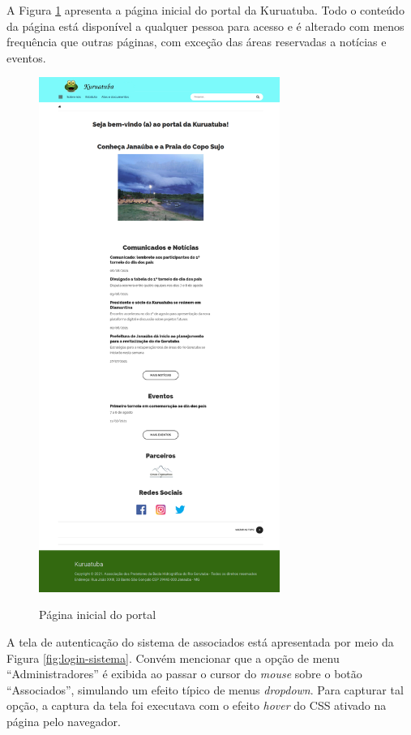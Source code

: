 A Figura \ref{fig:home-portal} apresenta a página inicial do portal da Kuruatuba. Todo o conteúdo da página está disponível a qualquer pessoa para acesso e é alterado com menos frequência que outras páginas, com exceção das áreas reservadas a notícias e eventos.

\clearpage
\newpage

\begin{figure}[htb]
 \centering
 \caption{Página inicial do portal}
 \includegraphics[width=0.7\textwidth]{figuras/kuruatuba_portal_home.png}
 \label{fig:home-portal}
\end{figure}

\newpage
\clearpage

A tela de autenticação do sistema de associados está apresentada por meio da Figura \ref{fig:login-sistema}. Convém mencionar que a opção de menu ``Administradores'' é exibida ao passar o cursor do \textit{mouse} sobre o botão ``Associados'', simulando um efeito típico de menus \textit{dropdown}. Para capturar tal opção, a captura da tela foi executava com o efeito \textit{hover} do CSS ativado na página pelo navegador. 


